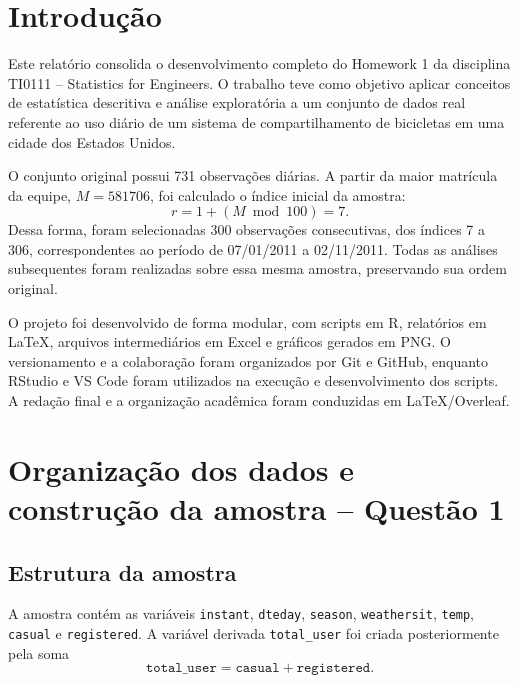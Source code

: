 \documentclass[12pt,oneside,a4paper,english,brazil]{abntex2}
\begin{document}
\tableofcontents*
\cleardoublepage

\listoffigures*
\cleardoublepage

\listoftables*
\cleardoublepage

\textual
\pagestyle{abntmain}
\chapter{Introdução}

Este relatório consolida o desenvolvimento completo do Homework 1 da disciplina TI0111 -- Statistics for Engineers. O trabalho teve como objetivo aplicar conceitos de estatística descritiva e análise exploratória a um conjunto de dados real referente ao uso diário de um sistema de compartilhamento de bicicletas em uma cidade dos Estados Unidos.

O conjunto original possui 731 observações diárias. A partir da maior matrícula da equipe, $M=581706$, foi calculado o índice inicial da amostra:
\begin{equation}
r = 1 + (M \bmod 100)=7.
\end{equation}
Dessa forma, foram selecionadas 300 observações consecutivas, dos índices 7 a 306, correspondentes ao período de 07/01/2011 a 02/11/2011. Todas as análises subsequentes foram realizadas sobre essa mesma amostra, preservando sua ordem original.

O projeto foi desenvolvido de forma modular, com scripts em R, relatórios em LaTeX, arquivos intermediários em Excel e gráficos gerados em PNG. O versionamento e a colaboração foram organizados por Git e GitHub, enquanto RStudio e VS Code foram utilizados na execução e desenvolvimento dos scripts. A redação final e a organização acadêmica foram conduzidas em LaTeX/Overleaf.

\chapter{Organização dos dados e construção da amostra -- Questão 1}

\section{Estrutura da amostra}

A amostra contém as variáveis \texttt{instant}, \texttt{dteday}, \texttt{season}, \texttt{weathersit}, \texttt{temp}, \texttt{casual} e \texttt{registered}. A variável derivada \texttt{total\_user} foi criada posteriormente pela soma
\begin{equation}
\texttt{total\_user}=\texttt{casual}+\texttt{registered}.
\end{equation}
\end{document}

